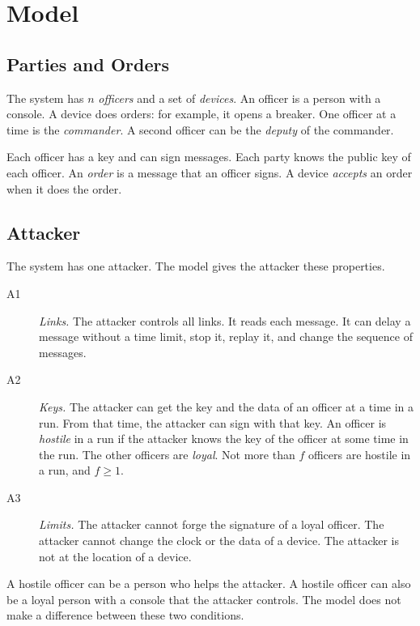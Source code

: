 \section{Model}
\label{sec:model}

\subsection{Parties and Orders}

The system has $n$ \emph{officers} and a set of \emph{devices}. An officer is a person with
a console. A device does orders: for example, it opens a breaker. One officer at a time is
the \emph{commander}. A second officer can be the \emph{deputy} of the commander.

Each officer has a key and can sign messages. Each party knows the public key of each
officer. An \emph{order} is a message that an officer signs. A device \emph{accepts} an
order when it does the order.

\subsection{Attacker}

The system has one attacker. The model gives the attacker these properties.
\begin{description}
  \item[A1] \emph{Links.} The attacker controls all links. It reads each message. It can delay a
  message without a time limit, stop it, replay it, and change the sequence of messages.
  \item[A2] \emph{Keys.} The attacker can get the key and the data of an officer at a time in a run.
  From that time, the attacker can sign with that key. An officer is \emph{hostile} in a
  run if the attacker knows the key of the officer at some time in the run. The other
  officers are \emph{loyal}. Not more than $f$ officers are hostile in a run, and
  $f \ge 1$.
  \item[A3] \emph{Limits.} The attacker cannot forge the signature of a loyal officer. The attacker
  cannot change the clock or the data of a device. The attacker is not at the location of
  a device.
\end{description}

A hostile officer can be a person who helps the attacker. A hostile officer can also be a
loyal person with a console that the attacker controls. The model does not make a
difference between these two conditions.

